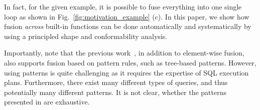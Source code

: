 In fact, for the given example, it is possible to fuse everything into one
single loop as shown in Fig.~\ref{fig:motivation_example} (c).
In this paper, we show how fusion \textit{across} built-in functions can be
done automatically and systematically by using a principled shape and
conformability analysis. 

Importantly, note that the previous work~\OldPaper, in addition to element-wise
fusion, also supports fusion based on pattern rules, such as tree-based patterns.
However, using patterns is quite challenging as it requires the expertise of
SQL execution plans. Furthermore, there exist many different types of queries,
and thus potentially many different patterns. It is not clear, whether the
patterns presented in \OldPaper are exhaustive. 


